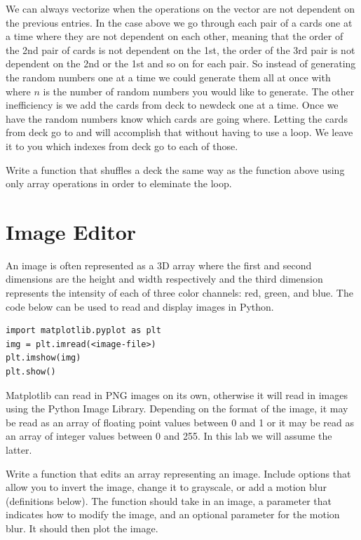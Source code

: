 We can always vectorize when the operations on the vector are not dependent on the previous entries. In the case above we go through each pair of a cards one at a time where they are not dependent on each other, meaning that the order of the 2nd pair of cards is not dependent on the 1st, the order of the 3rd pair is not dependent on the 2nd or the 1st and so on for each pair. So instead of generating the random numbers one at a time we could generate them all at once with  where $n$ is the number of random numbers you would like to generate. The other inefficiency is we add the cards from deck to newdeck one at a time.  Once we have the random numbers know which cards are going where.  Letting the cards from deck go to  and  will accomplish that without having to use a loop. We leave it to you which indexes from deck go to each of those.

\begin{problem}
Write a function that shuffles a deck the same way as the function above using only array operations in order to eleminate the loop.
\end{problem}

\section*{Image Editor}
An image is often represented as a 3D array where the first and second dimensions are the height and width respectively and the third dimension represents the intensity of each of three color channels: red, green, and blue.
The code below can be used to read and display images in Python.
\begin{lstlisting}
import matplotlib.pyplot as plt
img = plt.imread(<image-file>)
plt.imshow(img)
plt.show()
\end{lstlisting}

Matplotlib can read in PNG images on its own, otherwise it will read in images using the Python Image Library.
Depending on the format of the image, it may be read as an array of floating point values between 0 and 1 or it may be read as an array of integer values between 0 and 255.
In this lab we will assume the latter.

\begin{problem}
Write a function that edits an array representing an image.
Include options that allow you to  invert the image, change it to grayscale, or add a motion blur (definitions below).
The function should take in an image, a parameter that indicates how to modify the image, and an optional parameter for the motion blur.
It should then plot the image.
\end{problem}

